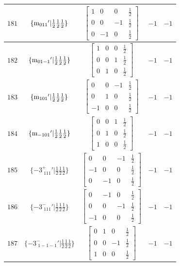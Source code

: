 \documentclass[fleqn,8pt]{jsarticle}
\begin{document}
\begin{longtable}{ccccc}
$ 181 $ & $ \{{\rm m}_{011}{}'|\frac{1}{2} \frac{1}{2} \frac{1}{2}\} $ & $ \begin{bmatrix} 1 & 0 & 0 & \frac{1}{2} \\ 0 & 0 & -1 & \frac{1}{2} \\ 0 & -1 & 0 & \frac{1}{2} \end{bmatrix} $ & $ -1 $ & $ -1 $ \\ \hline
$ 182 $ & $ \{{\rm m}_{01-1}{}'|\frac{1}{2} \frac{1}{2} \frac{1}{2}\} $ & $ \begin{bmatrix} 1 & 0 & 0 & \frac{1}{2} \\ 0 & 0 & 1 & \frac{1}{2} \\ 0 & 1 & 0 & \frac{1}{2} \end{bmatrix} $ & $ -1 $ & $ -1 $ \\ \hline
$ 183 $ & $ \{{\rm m}_{101}{}'|\frac{1}{2} \frac{1}{2} \frac{1}{2}\} $ & $ \begin{bmatrix} 0 & 0 & -1 & \frac{1}{2} \\ 0 & 1 & 0 & \frac{1}{2} \\ -1 & 0 & 0 & \frac{1}{2} \end{bmatrix} $ & $ -1 $ & $ -1 $ \\ \hline
$ 184 $ & $ \{{\rm m}_{-101}{}'|\frac{1}{2} \frac{1}{2} \frac{1}{2}\} $ & $ \begin{bmatrix} 0 & 0 & 1 & \frac{1}{2} \\ 0 & 1 & 0 & \frac{1}{2} \\ 1 & 0 & 0 & \frac{1}{2} \end{bmatrix} $ & $ -1 $ & $ -1 $ \\ \hline
$ 185 $ & $ \{-3^{+}_{\,\,111}{}'|\frac{1}{2} \frac{1}{2} \frac{1}{2}\} $ & $ \begin{bmatrix} 0 & 0 & -1 & \frac{1}{2} \\ -1 & 0 & 0 & \frac{1}{2} \\ 0 & -1 & 0 & \frac{1}{2} \end{bmatrix} $ & $ -1 $ & $ -1 $ \\ \hline
$ 186 $ & $ \{-3^{-}_{\,\,111}{}'|\frac{1}{2} \frac{1}{2} \frac{1}{2}\} $ & $ \begin{bmatrix} 0 & -1 & 0 & \frac{1}{2} \\ 0 & 0 & -1 & \frac{1}{2} \\ -1 & 0 & 0 & \frac{1}{2} \end{bmatrix} $ & $ -1 $ & $ -1 $ \\ \hline
$ 187 $ & $ \{-3^{-}_{\,\,1-1-1}{}'|\frac{1}{2} \frac{1}{2} \frac{1}{2}\} $ & $ \begin{bmatrix} 0 & 1 & 0 & \frac{1}{2} \\ 0 & 0 & -1 & \frac{1}{2} \\ 1 & 0 & 0 & \frac{1}{2} \end{bmatrix} $ & $ -1 $ & $ -1 $ \\ \hline

\end{longtable}
\end{document}
